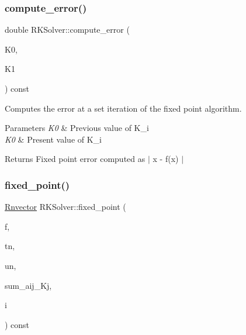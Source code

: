 \subsubsection{\texorpdfstring{compute\+\_\+error()}{compute\_error()}}
{\footnotesize\ttfamily double R\+K\+Solver\+::compute\+\_\+error (\begin{DoxyParamCaption}\item[{const \hyperlink{utils_8hpp_a8e0cccfe9e5cee5140bfcfbd9a3a6a0e}{Rnvector} \&}]{K0,  }\item[{const \hyperlink{utils_8hpp_a8e0cccfe9e5cee5140bfcfbd9a3a6a0e}{Rnvector} \&}]{K1 }\end{DoxyParamCaption}) const\hspace{0.3cm}{\ttfamily [protected]}}



Computes the error at a set iteration of the fixed point algorithm. 


\begin{DoxyParams}{Parameters}
{\em K0} & Previous value of K\+\_\+i \\
\hline
{\em K0} & Present value of K\+\_\+i \\
\hline
\end{DoxyParams}
\begin{DoxyReturn}{Returns}
Fixed point error computed as $\vert$ x -\/ f(x) $\vert$ 
\end{DoxyReturn}
\mbox{\label{classRKSolver_abb7c57c57c820ab981eab492ad9511db}} 
\subsubsection{\texorpdfstring{fixed\+\_\+point()}{fixed\_point()}}
{\footnotesize\ttfamily \hyperlink{utils_8hpp_a8e0cccfe9e5cee5140bfcfbd9a3a6a0e}{Rnvector} R\+K\+Solver\+::fixed\+\_\+point (\begin{DoxyParamCaption}\item[{const \hyperlink{structEquationFunction}{Equation\+Function} \&}]{f,  }\item[{const double}]{tn,  }\item[{const \hyperlink{utils_8hpp_a8e0cccfe9e5cee5140bfcfbd9a3a6a0e}{Rnvector} \&}]{un,  }\item[{const \hyperlink{utils_8hpp_a8e0cccfe9e5cee5140bfcfbd9a3a6a0e}{Rnvector} \&}]{sum\+\_\+aij\+\_\+\+Kj,  }\item[{const size\+\_\+t}]{i }\end{DoxyParamCaption}) const\hspace{0.3cm}{\ttfamily [protected]}}



